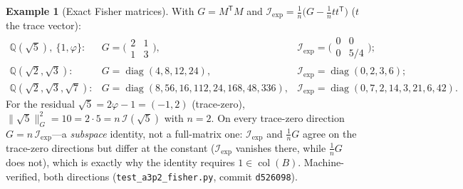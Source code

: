 \documentclass[11pt]{article}
\theoremstyle{plain}
\theoremstyle{definition}
\newtheorem{example}[theorem]{Example}
\theoremstyle{remark}
\newcommand{\Q}{\mathbb{Q}}
\newcommand{\Fish}{\mathcal{I}}
\newcommand{\GG}{G}
\newcommand{\BB}{B}
\newcommand{\transpose}{^{\mathsf{T}}}
\DeclareMathOperator{\col}{col}
\DeclareMathOperator{\diag}{diag}
\begin{document}
\begin{example}[Exact Fisher matrices]\label{ex:fisher}
With $G=M\transpose M$ and $\Fish_{\mathrm{exp}}=\tfrac1n\big(\GG-\tfrac1n t t\transpose\big)$
($t$ the trace vector):
\[
\begin{array}{lll}
  \Q(\sqrt5),\ \{1,\varphi\}: & \GG=\big(\begin{smallmatrix}2&1\\1&3\end{smallmatrix}\big), &
    \Fish_{\mathrm{exp}}=\big(\begin{smallmatrix}0&0\\0&5/4\end{smallmatrix}\big);\\[3pt]
  \Q(\sqrt2,\sqrt3): & \GG=\diag(4,8,12,24), & \Fish_{\mathrm{exp}}=\diag(0,2,3,6);\\[2pt]
  \Q(\sqrt2,\sqrt3,\sqrt7): & \GG=\diag(8,56,16,112,24,168,48,336), & \Fish_{\mathrm{exp}}=\diag(0,7,2,14,3,21,6,42).
\end{array}
\]
For the residual $\sqrt5=2\varphi-1=(-1,2)$ (trace-zero), $\lVert\sqrt5\rVert_\GG^2=10=2\cdot5=n\,\Fish(\sqrt5)$
with $n=2$. On every trace-zero direction $\GG=n\,\Fish_{\mathrm{exp}}$---a \emph{subspace} identity, not a
full-matrix one: $\Fish_{\mathrm{exp}}$ and $\tfrac1n\GG$ agree on the trace-zero directions but differ at the
constant ($\Fish_{\mathrm{exp}}$ vanishes there, while $\tfrac1n\GG$ does not), which is exactly why the
identity requires $1\in\col(\BB)$. Machine-verified, both directions
(\texttt{test\_a3p2\_fisher.py}, commit \texttt{d526098}).
\end{example}
\end{document}
